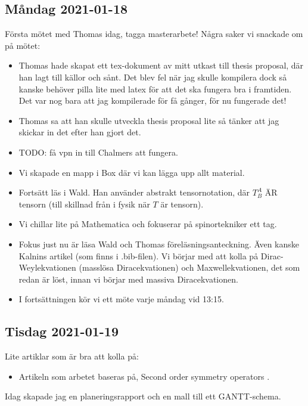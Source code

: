 \subsection{Måndag 2021-01-18}

Första mötet med Thomas idag, tagga masterarbete! Några saker vi snackade om på mötet:
\begin{itemize}
	\item Thomas hade skapat ett tex-dokument av mitt utkast till thesis proposal, där han lagt till källor och sånt. Det blev fel när jag skulle kompilera dock så kanske behöver pilla lite med latex för att det ska fungera bra i framtiden. Det var nog bara att jag kompilerade för få gånger, för nu fungerade det!
	\item Thomas sa att han skulle utveckla thesis proposal lite så tänker att jag skickar in det efter han gjort det.
	\item TODO: få vpn in till Chalmers att fungera.
	\item Vi skapade en mapp i Box där vi kan lägga upp allt material.
	\item Fortsätt läs i Wald. Han använder abstrakt tensornotation, där $T^A_B$ ÄR tensorn (till skillnad från i fysik när $T$ är tensorn).
	\item Vi chillar lite på Mathematica och fokuserar på spinortekniker ett tag.
	\item Fokus just nu är läsa Wald och Thomas föreläsningsanteckning. Även kanske Kalnins artikel (som finns i .bib-filen). Vi börjar med att kolla på Dirac-Weylekvationen (masslösa Diracekvationen) och Maxwellekvationen, det som redan är löst, innan vi börjar med massiva Diracekvationen.
	\item I fortsättningen kör vi ett möte varje måndag vid 13:15.
\end{itemize}


\subsection{Tisdag 2021-01-19}

Lite artiklar som är bra att kolla på:
\begin{itemize}
	\item Artikeln som arbetet baseras på, Second order symmetry operators \cite{AndBaeBlu14a}.
\end{itemize}

Idag skapade jag en planeringsrapport och en mall till ett GANTT-schema.

